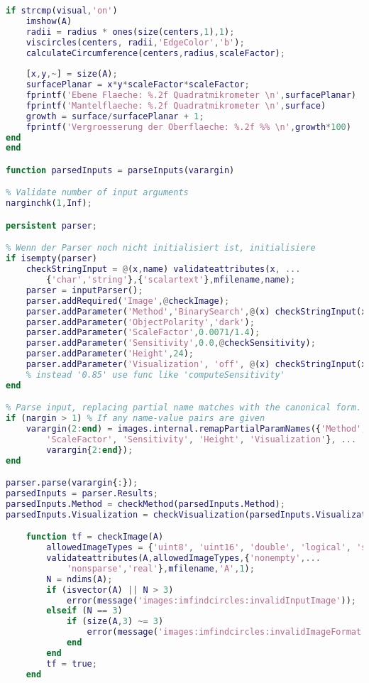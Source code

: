 \begin{lstlisting}[language=MATLAB, caption=Verfeinerung der lokalen Minima, label=lst:calculateSurfaceByDIP]
%% VISUALIZATION?
if strcmp(visual,'on')
    imshow(A)
    radii = radius * ones(size(centers,1),1);
    viscircles(centers, radii,'EdgeColor','b');
    calculateCircumference(centers,radius,scaleFactor);
    
    [x,y,~] = size(A);
    surfacePlanar = x*y*scaleFactor*scaleFactor;
    fprintf('Ebene Flaeche: %.2f Quadratmikrometer \n',surfacePlanar)
    fprintf('Mantelflaeche: %.2f Quadratmikrometer \n',surface)
    growth = surface/surfacePlanar + 1;
    fprintf('Vergroesserung der Oberflaeche: %.2f %% \n',growth*100)
end
end

function parsedInputs = parseInputs(varargin)

% Validate number of input arguments
narginchk(1,Inf);

persistent parser;

% Wenn der Parser noch nicht initialisiert ist, initialisiere
if isempty(parser)
    checkStringInput = @(x,name) validateattributes(x, ...
        {'char','string'},{'scalartext'},mfilename,name);
    parser = inputParser();
    parser.addRequired('Image',@checkImage);
    parser.addParameter('Method','BinarySearch',@(x) checkStringInput(x,'Method'));
    parser.addParameter('ObjectPolarity','dark');
    parser.addParameter('ScaleFactor',0.0071/1.4);
    parser.addParameter('Sensitivity',0.0,@checkSensitivity);
    parser.addParameter('Height',24);
    parser.addParameter('Visualization', 'off', @(x) checkStringInput(x,'Visualization'));
    % instead '0.85' use func like 'computeSensitivity'
end

% Parse input, replacing partial name matches with the canonical form.
if (nargin > 1) % If any name-value pairs are given
    varargin(2:end) = images.internal.remapPartialParamNames({'Method', 'ObjectPolarity', ...
        'ScaleFactor', 'Sensitivity', 'Height', 'Visualization'}, ...
        varargin{2:end});
end

parser.parse(varargin{:});
parsedInputs = parser.Results;
parsedInputs.Method = checkMethod(parsedInputs.Method);
parsedInputs.Visualization = checkVisualization(parsedInputs.Visualization);

    function tf = checkImage(A)
        allowedImageTypes = {'uint8', 'uint16', 'double', 'logical', 'single', 'int16'};
        validateattributes(A,allowedImageTypes,{'nonempty',...
            'nonsparse','real'},mfilename,'A',1);
        N = ndims(A);
        if (isvector(A) || N > 3)
            error(message('images:imfindcircles:invalidInputImage'));
        elseif (N == 3)
            if (size(A,3) ~= 3)
                error(message('images:imfindcircles:invalidImageFormat'));
            end
        end
        tf = true;
    end


\end{lstlisting}
